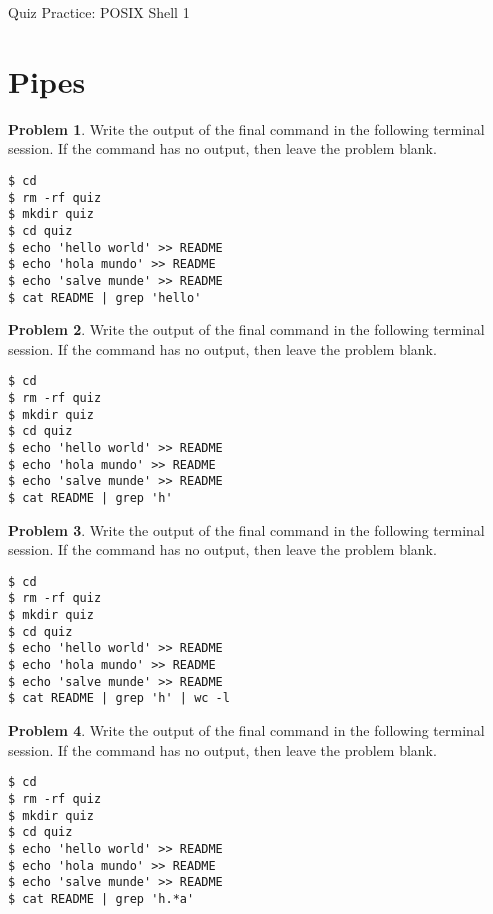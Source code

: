 \documentclass[10pt]{article}
\theoremstyle{definition}
\newtheorem{problem}{Problem}
\begin{document}
\begin{center}
    {
\Large
    Quiz Practice: POSIX Shell 1
}

    \vspace{0.1in}
\end{center}

\section{Pipes}

\begin{problem}
    Write the output of the final command in the following terminal session.
    If the command has no output, then leave the problem blank.
\end{problem}
\begin{lstlisting}
$ cd
$ rm -rf quiz
$ mkdir quiz
$ cd quiz
$ echo 'hello world' >> README
$ echo 'hola mundo' >> README
$ echo 'salve munde' >> README
$ cat README | grep 'hello'
\end{lstlisting}
\vspace{0.4in}

\begin{problem}
    Write the output of the final command in the following terminal session.
    If the command has no output, then leave the problem blank.
\end{problem}
\begin{lstlisting}
$ cd
$ rm -rf quiz
$ mkdir quiz
$ cd quiz
$ echo 'hello world' >> README
$ echo 'hola mundo' >> README
$ echo 'salve munde' >> README
$ cat README | grep 'h'
\end{lstlisting}
\vspace{0.4in}

\begin{problem}
    Write the output of the final command in the following terminal session.
    If the command has no output, then leave the problem blank.
\end{problem}
\begin{lstlisting}
$ cd
$ rm -rf quiz
$ mkdir quiz
$ cd quiz
$ echo 'hello world' >> README
$ echo 'hola mundo' >> README
$ echo 'salve munde' >> README
$ cat README | grep 'h' | wc -l
\end{lstlisting}
\vspace{0.4in}

\begin{problem}
    Write the output of the final command in the following terminal session.
    If the command has no output, then leave the problem blank.
\end{problem}
\begin{lstlisting}
$ cd
$ rm -rf quiz
$ mkdir quiz
$ cd quiz
$ echo 'hello world' >> README
$ echo 'hola mundo' >> README
$ echo 'salve munde' >> README
$ cat README | grep 'h.*a'
\end{lstlisting}
\vspace{0.4in}
\end{document}
